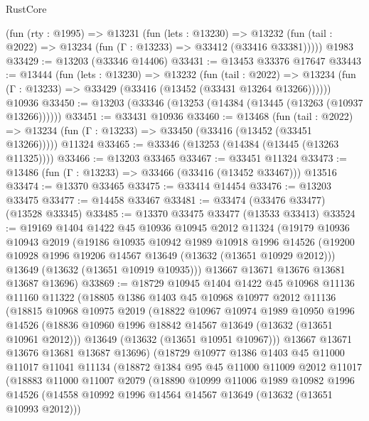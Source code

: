 \begin{lexlean}{RustCore}
\begin{coremodule}
    (fun (rty : @1995) =>
    @13231
      (fun (lets : @13230) =>
      @13232 (fun (tail : @2022) => @13234 (fun (Γ : @13233) => @33412 (@33416 @33381)))))
    @1983
@33429 := @13203 (@33346 @14406)
@33431 := @13453 @33376 @17647
@33443 := @13444
    (fun (lets : @13230) =>
    @13232
      (fun (tail : @2022) =>
      @13234 (fun (Γ : @13233) => @33429 (@33416 (@13452 (@33431 @13264 @13266))))))
    @10936
@33450 := @13203 (@33346 (@13253 (@14384 (@13445 (@13263 (@10937 @13266))))))
@33451 := @33431 @10936
@33460 := @13468
    (fun (tail : @2022) => @13234 (fun (Γ : @13233) => @33450 (@33416 (@13452 (@33451 @13266)))))
    @11324
@33465 := @33346 (@13253 (@14384 (@13445 (@13263 @11325))))
@33466 := @13203 @33465
@33467 := @33451 @11324
@33473 := @13486 (fun (Γ : @13233) => @33466 (@33416 (@13452 @33467))) @13516
@33474 := @13370 @33465
@33475 := @33414 @14454
@33476 := @13203 @33475
@33477 := @14458 @33467
@33481 := @33474 (@33476 @33477) (@13528 @33345)
@33485 := @13370 @33475 @33477 (@13533 @33413)
@33524 := @19169
    @1404
    @1422
    @45
    @10936
    @10945
    @2012
    @11324
    (@19179
      @10936
      @10943
      @2019
      (@19186
        @10935
        @10942
        @1989
        @10918
        @1996
        @14526
        (@19200 @10928 @1996 @19206 @14567 @13649 (@13632 (@13651 @10929 @2012)))
        @13649
        (@13632 (@13651 @10919 @10935)))
      @13667
      @13671
      @13676
      @13681
      @13687
      @13696)
@33869 := @18729
    @10945
    @1404
    @1422
    @45
    @10968
    @11136
    @11160
    @11322
    (@18805
      @1386
      @1403
      @45
      @10968
      @10977
      @2012
      @11136
      (@18815
        @10968
        @10975
        @2019
        (@18822
          @10967
          @10974
          @1989
          @10950
          @1996
          @14526
          (@18836 @10960 @1996 @18842 @14567 @13649 (@13632 (@13651 @10961 @2012)))
          @13649
          (@13632 (@13651 @10951 @10967)))
        @13667
        @13671
        @13676
        @13681
        @13687
        @13696)
      (@18729
        @10977
        @1386
        @1403
        @45
        @11000
        @11017
        @11041
        @11134
        (@18872
          @1384
          @95
          @45
          @11000
          @11009
          @2012
          @11017
          (@18883
            @11000
            @11007
            @2079
            (@18890
              @10999
              @11006
              @1989
              @10982
              @1996
              @14526
              (@14558 @10992 @1996 @14564 @14567 @13649 (@13632 (@13651 @10993 @2012)))

\end{coremodule}
\end{lexlean}
